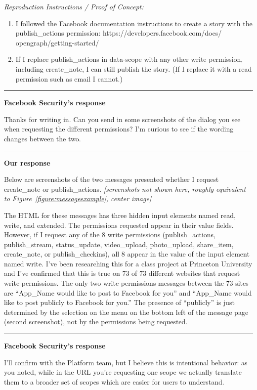 \documentclass[10pt]{sig-alternate-10pt}
\begin{document}
\noindent \emph{Reproduction Instructions / Proof of Concept:}
\begin{enumerate}
  \item I followed the Facebook documentation instructions to create a story with the publish\_actions permission: https://developers.facebook.com/docs/ opengraph/getting-started/
  \item If I replace publish\_actions in data-scope with any other write permission, including create\_note, I can still publish the story. (If I replace it with a read permission such as email I cannot.)
\end{enumerate}

\noindent\rule{6cm}{0.4pt}

\noindent\textbf{Facebook Security's response}

\noindent Thanks for writing in. Can you send in some screenshots of the dialog you see when requesting the different permissions? I'm curious to see if the wording changes between the two.

\noindent\rule{6cm}{0.4pt}

\noindent\textbf{Our response}

\noindent Below are screenshots of the two messages presented whether I request create\_note or publish\_actions. \textit{[screenshots not shown here, roughly equivalent to Figure~\ref{figure:messageexample}, center image]}

The HTML for these messages has three hidden input elements named read, write, and extended. The permissions requested appear in their value fields. However, if I request any of the 8 write permissions (publish\_actions, publish\_stream, status\_update, video\_upload, photo\_upload, share\_item, create\_note, or publish\_checkins), all 8 appear in the value of the input element named write. I've been researching this for a class project at Princeton University and I've confirmed that this is true on 73 of 73 different websites that request write permissions. The only two write permissions messages between the 73 sites are ``App\_Name would like to post to Facebook for you'' and ``App\_Name would like to post publicly to Facebook for you.'' The presence of ``publicly'' is just determined by the selection on the menu on the bottom left of the message page (second screenshot), not by the permissions being requested.

\noindent\rule{6cm}{0.4pt}

\noindent\textbf{Facebook Security's response}

\noindent I'll confirm with the Platform team, but I believe this is intentional behavior: as you noted, while in the URL you're requesting one scope we actually translate them to a broader set of scopes which are easier for users to understand.
\end{document}
